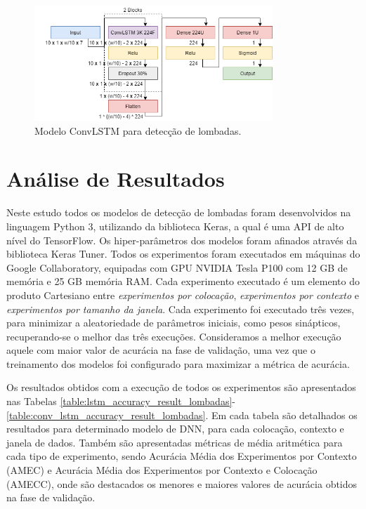 \begin{figure}[h!]
  \centering
  \caption{Modelo ConvLSTM para detecção de lombadas.}
  \label{fig:best_conv_lstm_tipo_lombadas}
  \includegraphics[width=0.8\textwidth]{figuras/fig_44.png}
\end{figure}

\section{Análise de Resultados}

Neste estudo todos os modelos de detecção de lombadas foram desenvolvidos na linguagem Python 3, utilizando da biblioteca Keras, a qual é uma API de alto nível do TensorFlow. Os hiper-parâmetros dos modelos foram afinados através da biblioteca Keras Tuner. Todos os experimentos foram executados em máquinas do Google Collaboratory, equipadas com GPU NVIDIA Tesla P100 com 12 GB de memória e 25 GB memória RAM. Cada experimento executado é um elemento do produto Cartesiano entre \emph{experimentos por colocação}, \emph{experimentos por contexto} e \emph{experimentos por tamanho da janela}. Cada experimento foi executado três vezes, para minimizar a aleatoriedade de parâmetros iniciais, como pesos sinápticos, recuperando-se o melhor das três execuções. Consideramos a melhor execução aquele com maior valor de acurácia na fase de validação, uma vez que o treinamento dos modelos foi configurado para maximizar a métrica de acurácia.

Os resultados obtidos com a execução de todos os experimentos são apresentados nas Tabelas \ref{table:lstm_accuracy_result_lombadas}-\ref{table:conv_lstm_accuracy_result_lombadas}. Em cada tabela são detalhados os resultados para determinado modelo de DNN, para cada colocação, contexto e janela de dados. Também são apresentadas métricas de média aritmética para cada tipo de experimento, sendo Acurácia Média dos Experimentos por Contexto (AMEC) e Acurácia Média dos Experimentos por Contexto e Colocação (AMECC), onde são destacados os menores e maiores valores de acurácia obtidos na fase de validação.

